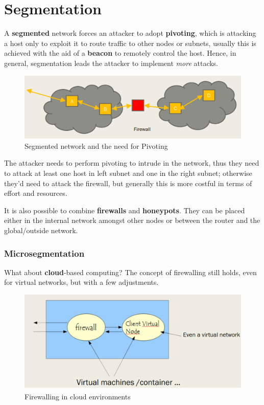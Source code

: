 \section{Segmentation}

A \textbf{segmented} network forces an attacker to adopt \textbf{pivoting},
which is attacking a host only to exploit it to route traffic to other nodes or subnets,
usually this is achieved with the aid of a \textbf{beacon} to remotely control the host.
Hence, in general, segmentation leads the attacker to implement \textit{more} attacks.

\begin{figure}[htbp]
   \centering
   \includegraphics{images/pivoting.png}
   \caption{Segmented network and the need for Pivoting}
   \label{fig:pivoting}
\end{figure}

The attacker needs to perform pivoting to intrude in the network, thus they need to attack at least one host in left subnet and one in the right subnet;
otherwise they'd need to attack the firewall, but generally this is more costful in terms of effort and resources.

It is also possible to combine \textbf{firewalls} and \textbf{honeypots}.
They can be placed either in the internal network amongst other nodes or between the router and the global/outside network.

\subsubsection{Microsegmentation}

What about \textbf{cloud}-based computing?
The concept of firewalling still holds,
even for virtual networks,
but with a few adjustments.
\begin{figure}[htbp]
   \centering
   \includegraphics{images/firewall_cloud.png}
   \caption{Firewalling in cloud environments}
   \label{fig:firewall_cloud}
\end{figure}

